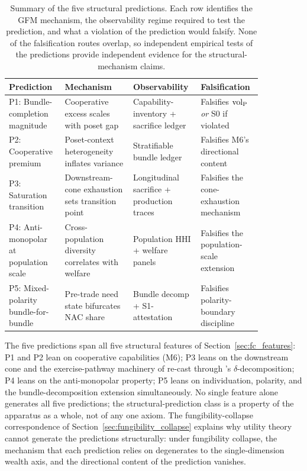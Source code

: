 \begin{table}[h]
\centering
\small
\begin{tabular}{p{0.20\linewidth} p{0.25\linewidth} p{0.20\linewidth} p{0.20\linewidth}}
\toprule
\textbf{Prediction} & \textbf{Mechanism} &
\textbf{Observability} & \textbf{Falsification} \\
\midrule
P1: Bundle-completion magnitude &
Cooperative excess scales with poset gap &
Capability-inventory + sacrifice ledger &
Falsifies ${\operatorname{vol}_{\mathrm{P}}}$ \emph{or} S0 if violated \\
\addlinespace
P2: Cooperative premium &
Poset-context heterogeneity inflates variance &
Stratifiable bundle ledger &
Falsifies M6's directional content \\
\addlinespace
P3: Saturation transition &
Downstream-cone exhaustion sets transition point &
Longitudinal sacrifice + production traces &
Falsifies the cone-exhaustion mechanism \\
\addlinespace
P4: Anti-monopolar at population scale &
Cross-population diversity correlates with welfare &
Population HHI + welfare panels &
Falsifies the population-scale extension \\
\addlinespace
P5: Mixed-polarity bundle-for-bundle &
Pre-trade need state bifurcates NAC share &
Bundle decomp + S1-attestation &
Falsifies polarity-boundary discipline \\
\bottomrule
\end{tabular}
\caption{Summary of the five structural predictions.  Each row
identifies the GFM mechanism, the observability regime required to
test the prediction, and what a violation of the prediction would
falsify.  None of the falsification routes overlap, so independent
empirical tests of the predictions provide independent evidence
for the structural-mechanism claims.}
\label{tab:predictions}
\end{table}

The five predictions span all five structural features of
Section~\ref{sec:fc_features}: P1 and P2 lean on cooperative
capabilities (M6); P3 leans on the downstream cone and the
exercise-pathway machinery of \citep[Horizon~Aware]{lasser2026horizon}
re-cast through \citep[Need~Sufficiency]{lasser2026paper8b}'s
$\delta$-decomposition; P4 leans on the anti-monopolar property; P5
leans on individuation, polarity, and the bundle-decomposition
extension simultaneously.  No single feature alone generates all
five predictions; the structural-prediction class is a property of
the apparatus as a whole, not of any one axiom.  The
fungibility-collapse correspondence of
Section~\ref{sec:fungibility_collapse} explains why utility theory
cannot generate the predictions structurally: under fungibility
collapse, the mechanism that each prediction relies on degenerates
to the single-dimension wealth axis, and the directional content of
the prediction vanishes.
